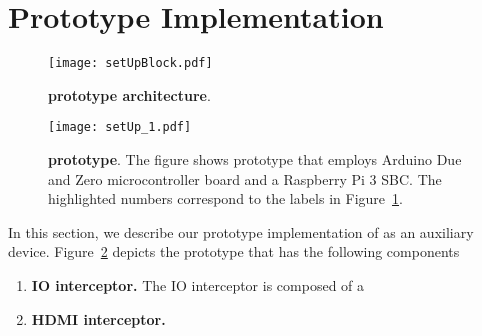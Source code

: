 \section{\name Prototype Implementation}
\label{sec:prototype}


\begin{figure}[t]
\centering
\texttt{[image: setUpBlock.pdf]}
\caption{\textbf{\name prototype architecture}. }
\label{fig:prototypeArch}
\centering
\end{figure}


\begin{figure}[t]
\centering
\texttt{[image: setUp\_1.pdf]}
\caption{\textbf{\name prototype}. The figure shows \name prototype that employs Arduino Due and Zero microcontroller board and a Raspberry Pi 3 SBC. The highlighted numbers correspond to the labels in Figure~\ref{fig:prototypeArch}.}
\label{fig:prototype}
\centering
\end{figure}

In this section, we describe our prototype implementation of \name as an auxiliary device. Figure~\ref{fig:prototype} depicts the \name prototype that has the following components

\begin{enumerate}
  \item \textbf{IO interceptor.} The IO interceptor is composed of a  
  \item \textbf{HDMI interceptor.} 
\end{enumerate}